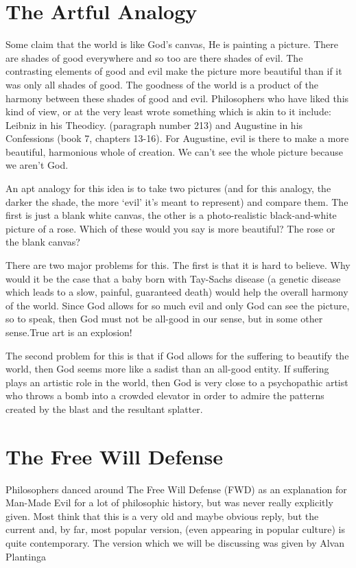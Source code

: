 \section{The Artful Analogy}
Some claim that the world is like God’s canvas, He is painting a picture. There are shades of good everywhere and so too are there shades of evil. The contrasting elements of good and evil make the picture more beautiful than if it was only all shades of good. The goodness of the world is a product of the harmony between these shades of good and evil. Philosophers who have liked this kind of view, or at the very least wrote something which is akin to it include: Leibniz in his Theodicy\autocite{Leibniz1}. (paragraph number 213) and Augustine in his Confessions (book 7, chapters 13-16).\autocite{Augustine1} For Augustine, evil is there to make a more beautiful, harmonious whole of creation. We can't see the whole picture because we aren't God. 

An apt analogy for this idea is to take two pictures (and for this analogy, the darker the shade, the more `evil' it's meant to represent) and compare them. The first is just a blank white canvas, the other is a photo-realistic black-and-white picture of a rose. Which of these would you say is more beautiful? The rose or the blank canvas?

There are two major problems for this. The first is that it is hard to believe. Why would it be the case that a baby born with Tay-Sachs disease (a genetic disease which leads to a slow, painful, guaranteed death) would help the overall harmony of the world. Since God allows for so much evil and only God can see the picture, so to speak, then God must not be all-good in our sense, but in some other sense.True art is an explosion!

The second problem for this is that if God allows for the suffering to beautify the world, then God seems more like a sadist than an all-good entity. If suffering plays an artistic role in the world, then God is very close to a psychopathic artist who throws a bomb into a crowded elevator in order to admire the patterns created by the blast and the resultant splatter.

\section{The Free Will Defense}
Philosophers danced around The Free Will Defense (FWD) as an explanation for Man-Made Evil for a lot of philosophic history, but was never really explicitly given. Most think that this is a very old and maybe obvious reply, but the current and,  by far, most popular version, (even appearing in popular culture) is quite contemporary. The version which we will be discussing was given by Alvan Plantinga\autocite{Plantinga1}


